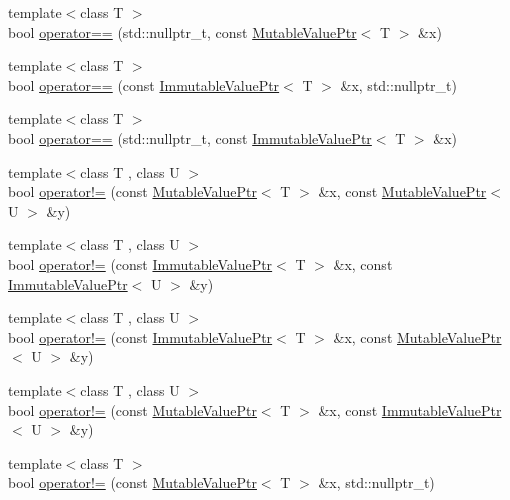\begin{DoxyCompactItemize}
{\footnotesize template$<$class T $>$ }\\bool \hyperlink{namespacereactor_a1c5731f8ed4863bfeaaeeba72f5eb765}{operator==} (std\+::nullptr\+\_\+t, const \hyperlink{classreactor_1_1MutableValuePtr}{Mutable\+Value\+Ptr}$<$ T $>$ \&x)
\item 
{\footnotesize template$<$class T $>$ }\\bool \hyperlink{namespacereactor_ab3fb80a815368302fcd1985b0fee5a6c}{operator==} (const \hyperlink{classreactor_1_1ImmutableValuePtr}{Immutable\+Value\+Ptr}$<$ T $>$ \&x, std\+::nullptr\+\_\+t)
\item 
{\footnotesize template$<$class T $>$ }\\bool \hyperlink{namespacereactor_a59010e2c0f2dd0420fb59abab0a20e10}{operator==} (std\+::nullptr\+\_\+t, const \hyperlink{classreactor_1_1ImmutableValuePtr}{Immutable\+Value\+Ptr}$<$ T $>$ \&x)
\item 
{\footnotesize template$<$class T , class U $>$ }\\bool \hyperlink{namespacereactor_a73f7e0bf8b9c8adf7cac8ecc521de7c7}{operator!=} (const \hyperlink{classreactor_1_1MutableValuePtr}{Mutable\+Value\+Ptr}$<$ T $>$ \&x, const \hyperlink{classreactor_1_1MutableValuePtr}{Mutable\+Value\+Ptr}$<$ U $>$ \&y)
\item 
{\footnotesize template$<$class T , class U $>$ }\\bool \hyperlink{namespacereactor_a79f6e5da337bd260b36b8e702160f1e6}{operator!=} (const \hyperlink{classreactor_1_1ImmutableValuePtr}{Immutable\+Value\+Ptr}$<$ T $>$ \&x, const \hyperlink{classreactor_1_1ImmutableValuePtr}{Immutable\+Value\+Ptr}$<$ U $>$ \&y)
\item 
{\footnotesize template$<$class T , class U $>$ }\\bool \hyperlink{namespacereactor_a247d25ed08296b3afc70c88f7f2e3b5e}{operator!=} (const \hyperlink{classreactor_1_1ImmutableValuePtr}{Immutable\+Value\+Ptr}$<$ T $>$ \&x, const \hyperlink{classreactor_1_1MutableValuePtr}{Mutable\+Value\+Ptr}$<$ U $>$ \&y)
\item 
{\footnotesize template$<$class T , class U $>$ }\\bool \hyperlink{namespacereactor_a71b00843b7797d6a9d52c3e0b85a06a7}{operator!=} (const \hyperlink{classreactor_1_1MutableValuePtr}{Mutable\+Value\+Ptr}$<$ T $>$ \&x, const \hyperlink{classreactor_1_1ImmutableValuePtr}{Immutable\+Value\+Ptr}$<$ U $>$ \&y)
\item 
{\footnotesize template$<$class T $>$ }\\bool \hyperlink{namespacereactor_aeef65c8dea31e1e64d5488fbd5be4f5f}{operator!=} (const \hyperlink{classreactor_1_1MutableValuePtr}{Mutable\+Value\+Ptr}$<$ T $>$ \&x, std\+::nullptr\+\_\+t)

\end{DoxyCompactItemize}

